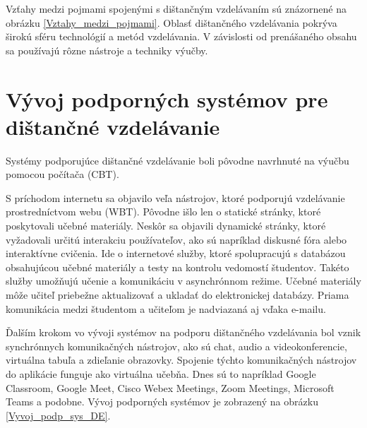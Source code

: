 \documentclass[10pt,oneside,slovak,a4paper]{article}
\begin{document}
Vzťahy medzi pojmami spojenými s dištančným vzdelávaním sú znázornené na obrázku \ref{Vztahy_medzi_pojmami}.%
Oblasť dištančného vzdelávania pokrýva širokú sféru technológií a metód vzdelávania. %
V závislosti od prenášaného obsahu sa používajú rôzne nástroje a techniky výučby.

\section{Vývoj podporných systémov pre dištančné vzdelávanie}%
\label{Vyvojsys}
Systémy podporujúce dištančné vzdelávanie boli pôvodne navrhnuté na výučbu pomocou počítača (CBT)\cite{WiktorzakKotowski}.%

S príchodom internetu sa objavilo veľa nástrojov, ktoré podporujú vzdelávanie prostredníctvom webu (WBT).
Pôvodne išlo len o statické stránky, ktoré poskytovali učebné materiály.
Neskôr sa objavili dynamické stránky, ktoré vyžadovali určitú interakciu používateľov, ako sú napríklad diskusné fóra alebo interaktívne cvičenia.
Ide o internetové služby, ktoré spolupracujú s databázou obsahujúcou učebné materiály a testy na kontrolu vedomostí študentov. %
Takéto služby umožňujú učenie a komunikáciu v asynchrónnom režime. Učebné materiály môže učiteľ priebežne aktualizovať a ukladať do elektronickej databázy.
Priama komunikácia medzi študentom a učiteľom je nadviazaná aj vďaka e-mailu.

Ďalším krokom vo vývoji systémov na podporu dištančného vzdelávania bol vznik synchrónnych komunikačných nástrojov, ako sú chat, audio a videokonferencie, virtuálna tabuľa a zdieľanie obrazovky.
Spojenie týchto komunikačných nástrojov do aplikácie funguje ako virtuálna učebňa.
Dnes sú to napríklad Google Classroom, Google Meet, Cisco Webex Meetings, Zoom Meetings, Microsoft Teams a podobne.
Vývoj podporných systémov je zobrazený na obrázku \ref{Vyvoj_podp_sys_DE}.
\end{document}
